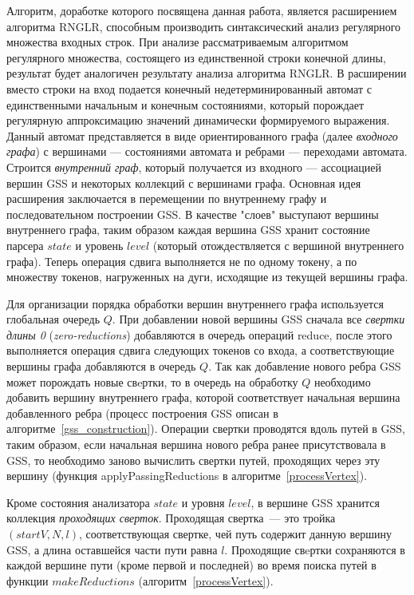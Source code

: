 Алгоритм, доработке которого посвящена данная работа, является расширением алгоритма RNGLR, способным производить синтаксический анализ регулярного множества входных строк. При анализе рассматриваемым алгоритмом регулярного множества, состоящего из единственной строки конечной длины, результат будет аналогичен результату анализа алгоритма RNGLR. В расширении вместо строки на вход подается конечный недетерминированный автомат с единственными начальным и конечным состояниями, который порождает регулярную аппроксимацию значений динамически формируемого выражения. Данный автомат представляется в виде ориентированного графа (далее \emph{входного графа}) с вершинами --- состояниями автомата и ребрами --- переходами автомата. Строится \emph{внутренний граф}, который получается из входного --- ассоциацией вершин GSS и некоторых коллекций с вершинами графа. Основная идея расширения заключается в перемещении по внутреннему графу и последовательном построении GSS. В качестве "слоев" выступают вершины внутреннего графа, таким образом каждая вершина GSS хранит состояние парсера $state$ и уровень $level$ (который отождествляется с вершиной внутреннего графа). Теперь операция сдвига выполняется не по одному токену, а по множеству токенов, нагруженных на дуги, исходящие из текущей вершины графа.

Для организации порядка обработки вершин внутреннего графа используется глобальная очередь $Q$. При добавлении новой вершины GSS сначала все \emph{свертки длины 0} (\emph{zero-reductions}) добавляются в очередь операций reduce, после этого выполняется операция сдвига следующих токенов со входа, а соответствующие вершины графа добавляются в очередь $Q$. Так как добавление нового ребра GSS может порождать новые свeртки, то в очередь на обработку $Q$ необходимо добавить вершину внутреннего графа, которой соответствует начальная вершина добавленного ребра (процесс построения GSS описан в алгоритме~\ref{gss_construction}). Операции свертки проводятся вдоль путей в GSS, таким образом, если начальная вершина нового ребра ранее присутствовала в GSS, то необходимо заново вычислить свертки путей, проходящих через эту вершину (функция applyPassingReductions в алгоритме~\ref{processVertex}).

Кроме состояния анализатора $state$ и уровня $level$, в вершине GSS хранится коллекция \emph{проходящих сверток}. Проходящая свертка~--- это тройка $(startV, N, l)$, соответствующая свертке, чей путь содержит данную вершину GSS, а длина оставшейся части пути равна $l$. Проходящие свeртки сохраняются в каждой вершине пути (кроме первой и последней) во время поиска путей в функции $makeReductions$ (алгоритм~\ref{processVertex}).


